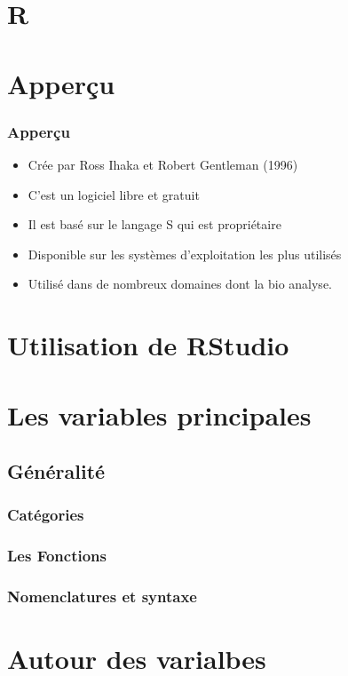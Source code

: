 \documentclass{beamer}
\begin{document}
\section{R}
\section{Apperçu}
\begin{frame}
	\frametitle{Apperçu}
	\begin{center}
		\begin{block}{}
			\begin{itemize}
				\item Crée par Ross Ihaka et Robert Gentleman (1996)
				\item C'est un logiciel libre et gratuit
				\item Il est basé sur le langage S qui est propriétaire
				\item Disponible sur les systèmes d'exploitation les plus utilisés
				\item Utilisé dans de nombreux domaines dont la bio analyse.
			\end{itemize}
		\end{block}
	\end{center}
\end{frame}
\section{Utilisation de RStudio}
\section{Les variables principales}
	\subsection{Généralité}
		\subsubsection{Catégories}
		\subsubsection{Les Fonctions}
		\subsubsection{Nomenclatures et syntaxe}
\section{Autour des varialbes}
\end{document}
